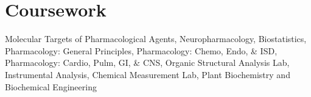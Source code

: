 \filbreak
\section{\mysidestyle Coursework}
Molecular Targets of Pharmacological Agents, Neuropharmacology, 
Biostatistics, Pharmacology: General Principles, Pharmacology: Chemo, Endo, \& ISD,
Pharmacology: Cardio, Pulm, GI, \& CNS, Organic Structural Analysis Lab, Instrumental Analysis, Chemical Measurement Lab, Plant Biochemistry and Biochemical Engineering